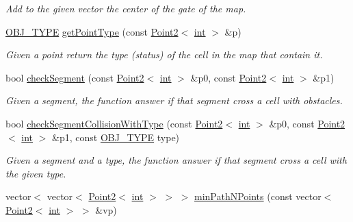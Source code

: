 \begin{DoxyCompactItemize}
\begin{DoxyCompactList}\small\item\em Add to the given vector the center of the gate of the map. \end{DoxyCompactList}\item 
\mbox{\hyperlink{map_8hh_a714b9c2c276fbae637fee36453d9121e}{O\+B\+J\+\_\+\+T\+Y\+PE}} \mbox{\hyperlink{class_mapp_ac6341641bd67502eef7c025cb4cd1c71}{get\+Point\+Type}} (const \mbox{\hyperlink{class_point2}{Point2}}$<$ \mbox{\hyperlink{draw_8hh_aa620a13339ac3a1177c86edc549fda9b}{int}} $>$ \&p)
\begin{DoxyCompactList}\small\item\em Given a point return the type (status) of the cell in the map that contain it. \end{DoxyCompactList}\item 
bool \mbox{\hyperlink{class_mapp_ade6135be96d93778352a7a313793adf3}{check\+Segment}} (const \mbox{\hyperlink{class_point2}{Point2}}$<$ \mbox{\hyperlink{draw_8hh_aa620a13339ac3a1177c86edc549fda9b}{int}} $>$ \&p0, const \mbox{\hyperlink{class_point2}{Point2}}$<$ \mbox{\hyperlink{draw_8hh_aa620a13339ac3a1177c86edc549fda9b}{int}} $>$ \&p1)
\begin{DoxyCompactList}\small\item\em Given a segment, the function answer if that segment cross a cell with obstacles. \end{DoxyCompactList}\item 
bool \mbox{\hyperlink{class_mapp_a8c48e05ec516f82efa0b1b7febe41292}{check\+Segment\+Collision\+With\+Type}} (const \mbox{\hyperlink{class_point2}{Point2}}$<$ \mbox{\hyperlink{draw_8hh_aa620a13339ac3a1177c86edc549fda9b}{int}} $>$ \&p0, const \mbox{\hyperlink{class_point2}{Point2}}$<$ \mbox{\hyperlink{draw_8hh_aa620a13339ac3a1177c86edc549fda9b}{int}} $>$ \&p1, const \mbox{\hyperlink{map_8hh_a714b9c2c276fbae637fee36453d9121e}{O\+B\+J\+\_\+\+T\+Y\+PE}} type)
\begin{DoxyCompactList}\small\item\em Given a segment and a type, the function answer if that segment cross a cell with the given type. \end{DoxyCompactList}\item 
vector$<$ vector$<$ \mbox{\hyperlink{class_point2}{Point2}}$<$ \mbox{\hyperlink{draw_8hh_aa620a13339ac3a1177c86edc549fda9b}{int}} $>$ $>$ $>$ \mbox{\hyperlink{class_mapp_a35ab624c5ab00d577580f132238147d8}{min\+Path\+N\+Points}} (const vector$<$ \mbox{\hyperlink{class_point2}{Point2}}$<$ \mbox{\hyperlink{draw_8hh_aa620a13339ac3a1177c86edc549fda9b}{int}} $>$ $>$ \&vp)

\end{DoxyCompactItemize}
